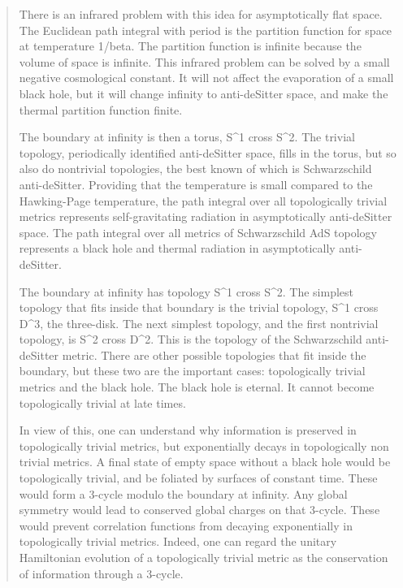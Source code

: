 \begin{quote}
     There is an infrared problem with this idea for asymptotically flat
     space.  The Euclidean path integral with period \beta  is the partition
     function for space at temperature 1/beta. The partition function 
     is infinite because the volume of space is infinite.  This infrared 
     problem can be solved by a small negative cosmological constant.  
     It will not affect the evaporation of a small black hole, but it will 
     change infinity to anti-deSitter space, and make the thermal partition 
     function finite.

     The boundary at infinity is then a torus, S^{1} cross S^{2}.  The trivial
     topology, periodically identified anti-deSitter space, fills in the 
     torus, but so also do nontrivial topologies, the best known of which 
     is Schwarzschild anti-deSitter.  Providing that the temperature is 
     small compared to the Hawking-Page temperature, the path integral 
     over all topologically trivial metrics represents self-gravitating 
     radiation in asymptotically anti-deSitter space.   The path integral 
     over all metrics of Schwarzschild AdS topology represents a black 
     hole and thermal radiation in asymptotically anti-deSitter.

     The boundary at infinity has topology S^{1} cross S^{2}.  The simplest
     topology that fits inside that boundary is the trivial topology, 
     S^{1} cross D^{3}, the three-disk. The next simplest topology, and 
     the first nontrivial topology, is S^{2} cross D^{2}.  
This is the 
     topology of the Schwarzschild anti-deSitter metric.  There are 
     other possible topologies that fit inside the boundary, but these 
     two are the important cases: topologically trivial metrics and 
     the black hole.  The black hole is eternal.  It cannot become 
     topologically trivial at late times.

     In view of this, one can understand why information is preserved in
     topologically trivial metrics, but exponentially decays in 
     topologically non trivial metrics.  A final state of empty space
     without a black hole would be topologically trivial, and be foliated
     by surfaces of constant time.  These would form a 3-cycle modulo
     the boundary at infinity.  Any global symmetry would lead to
     conserved global charges on that 3-cycle.  These would prevent
     correlation functions from decaying exponentially in topologically
     trivial metrics.  Indeed, one can regard the unitary Hamiltonian
     evolution of a topologically trivial metric as the conservation of
     information through a 3-cycle.


\end{quote}
